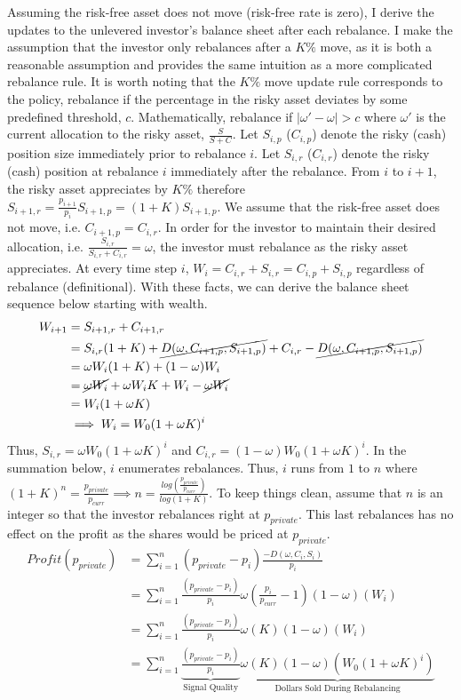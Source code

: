 \documentclass[12pt]{article}
\begin{document}
Assuming the risk-free asset does not move (risk-free rate is zero), I derive the updates to the unlevered investor's balance sheet after each rebalance. I make the assumption that the investor only rebalances after a $K\%$ move, as it is both a reasonable assumption and provides the same intuition as a more complicated rebalance rule. It is worth noting that the $K \%$ move update rule corresponds to the policy, rebalance if the percentage in the risky asset deviates by some predefined threshold, $c$. Mathematically, rebalance if $|\omega' - \omega| > c$ where $\omega'$ is the current allocation to the risky asset, $\frac{S}{S+C}$. Let $S_{i,p}$ ($C_{i,p}$) denote the risky (cash) position size immediately prior to rebalance $i$. Let $S_{i, r}$ ($C_{i, r}$) denote the risky (cash) position at rebalance $i$ immediately after the rebalance. From $i$ to $i+1$, the risky asset appreciates by $K\%$ therefore $S_{i+1, r} = \frac{p_{i+1}}{p_i}S_{i+1, p} = (1+K)S_{i+1, p}$. We assume that the risk-free asset does not move, i.e. $C_{i+1, p} = C_{i, r}$. In order for the investor to maintain their desired allocation, i.e. $\frac{S_{i,r}}{S_{i,r} + C_{i,r}} = \omega$, the investor must rebalance as the risky asset appreciates. At every time step $i$, $W_i = C_{i,r} + S_{i,r} = C_{i,p} + S_{i,p}$ regardless of rebalance (definitional). With these facts, we can derive the balance sheet sequence below starting with wealth.
\begin{align}
W_{i+1} &= S_{i+1, r} + C_{i+1,r} \nonumber \\
&= S_{i,r}(1+K) + \cancel{D(\omega, C_{i+1,p}, S_{i+1,p})} + C_{i, r} -\cancel{ D(\omega, C_{i+1,p}, S_{i+1,p})} \nonumber \\
&= \omega W_i (1+K) + (1-\omega) W_i \nonumber \\
&= \cancel{\omega W_i} + \omega W_i K + W_i - \cancel{\omega W_i} \nonumber \\
&= W_i(1+\omega K) \nonumber \\
&\implies W_i = W_0(1+\omega K)^i 
\end{align}
Thus, $S_{i,r} = \omega W_0 (1+\omega K)^i$ and $C_{i,r} = (1-\omega) W_0 (1+\omega K)^i$. In the summation below, $i$ enumerates rebalances. Thus, $i$ runs from $1$ to $n$ where $(1+K)^n = \frac{p_{private}}{p_{curr}} \implies n = \frac{log(\frac{p_{private}}{p_{curr}})}{log(1+K)}$. To keep things clean, assume that $n$ is an integer so that the investor rebalances right at $p_{private}$. This last rebalances has no effect on the profit as the shares would be priced at $p_{private}$.
\begin{align}
    Profit(p_{private}) &= \sum_{i = 1}^n(p_{private} - p_i) \frac{-D(\omega, C_i, S_i)}{p_i} \nonumber \\
    &= \sum_{i = 1}^n \frac{(p_{private} - p_i)}{p_i} \omega \left(\frac{p_i}{p_{curr}} - 1\right) (1-\omega) (W_i) \nonumber \\
    &= \sum_{i = 1}^n \frac{(p_{private} - p_i)}{p_i} \omega \left(K\right) (1-\omega) (W_i) \nonumber \\
    &= \sum_{i = 1}^n \underbrace{\frac{(p_{private} - p_i)}{p_i}}_\text{Signal Quality} \underbrace{\omega \left(K\right) (1-\omega) (W_0 (1+\omega K)^{i})}_\text{Dollars Sold During Rebalancing}
\end{align}
\end{document}
